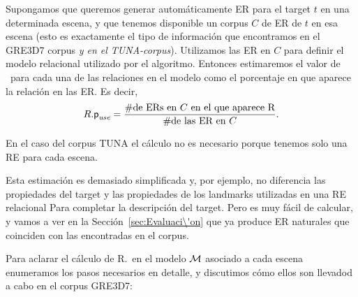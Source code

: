 


Supongamos que queremos generar autom\'aticamente ER para el target $t$ en una
determinada escena, y que tenemos disponible un corpus $C$ de ER de $t$
en esa escena (esto es exactamente el tipo de informaci\'on que encontramos en el
GRE3D7 corpus \textit{y en el TUNA-corpus}). Utilizamos las ER en $C$
para definir el modelo relacional utilizado por el algoritmo. Entonces 
estimaremos el valor de \puse\ para cada una de las relaciones en el modelo como el
porcentaje en que aparece la relaci\'on en las ER. Es decir,
\begin{equation} \label{eq1}
R.\textsf{p}_\textit{use} = \frac {\#\mbox{de ERs en $C$ en el que aparece R}} {\#\mbox{de las ER en $C$}}.
\end{equation}

En el caso del corpus TUNA el c\'alculo no es necesario
porque tenemos solo una RE para cada escena.

Esta estimaci\'on es demasiado simplificada y, por ejemplo, no 
diferencia las propiedades del target y las propiedades de
los landmarks utilizadas en una RE relacional Para completar la descripci\'on
del target. Pero es muy f\'acil de calcular, y vamos a ver
en la Secci\'on~\ref{sec:Evaluaci\'on} que ya produce ER naturales
que coinciden con las encontradas en el corpus.

Para aclarar el c\'alculo de R.\puse \ en el modelo $\mathcal{M}$ asociado
a cada escena enumeramos los pasos necesarios en detalle, y discutimos c\'omo
ellos son llevadod a cabo en el corpus GRE3D7:


